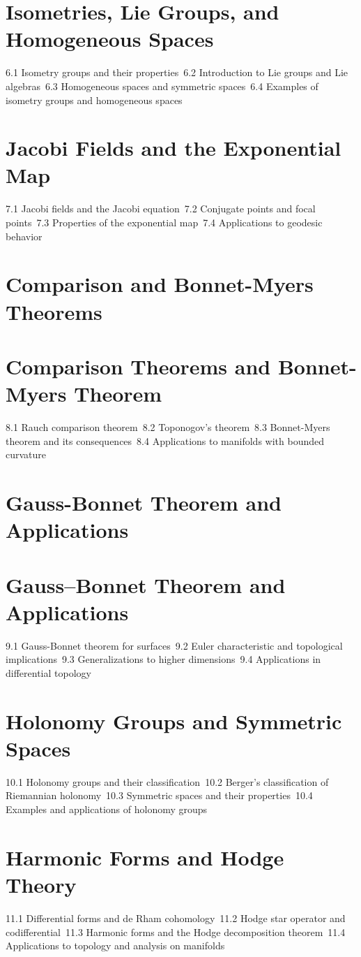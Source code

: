\section{Isometries, Lie Groups, and Homogeneous Spaces}
6.1 Isometry groups and their properties\
6.2 Introduction to Lie groups and Lie algebras\
6.3 Homogeneous spaces and symmetric spaces\
6.4 Examples of isometry groups and homogeneous spaces\
\section{Jacobi Fields and the Exponential Map}
7.1 Jacobi fields and the Jacobi equation\
7.2 Conjugate points and focal points\
7.3 Properties of the exponential map\
7.4 Applications to geodesic behavior\
\section{Comparison and Bonnet-Myers Theorems}
\section{Comparison Theorems and Bonnet-Myers Theorem}
8.1 Rauch comparison theorem\
8.2 Toponogov's theorem\
8.3 Bonnet-Myers theorem and its consequences\
8.4 Applications to manifolds with bounded curvature\
\section{Gauss-Bonnet Theorem and Applications}
\section{Gauss–Bonnet Theorem and Applications}
9.1 Gauss-Bonnet theorem for surfaces\
9.2 Euler characteristic and topological implications\
9.3 Generalizations to higher dimensions\
9.4 Applications in differential topology\
\section{Holonomy Groups and Symmetric Spaces}
10.1 Holonomy groups and their classification\
10.2 Berger's classification of Riemannian holonomy\
10.3 Symmetric spaces and their properties\
10.4 Examples and applications of holonomy groups\
\section{Harmonic Forms and Hodge Theory}
11.1 Differential forms and de Rham cohomology\
11.2 Hodge star operator and codifferential\
11.3 Harmonic forms and the Hodge decomposition theorem\
11.4 Applications to topology and analysis on manifolds\
